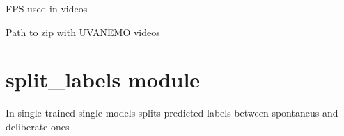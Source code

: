 \documentclass[letterpaper,10pt,english]{sphinxmanual}
\begin{document}
\begin{fulllineitems}
\begin{fulllineitems}
\begin{quote}
\begin{description}
\end{description}\end{quote}

\end{fulllineitems}


\begin{fulllineitems}
\label{\detokenize{net:net.UVANEMO.videos_frequency}}
\pysigstartsignatures
{}
\pysigstopsignatures
\sphinxAtStartPar
FPS used in videos

\end{fulllineitems}


\begin{fulllineitems}
\label{\detokenize{net:net.UVANEMO.videos_path}}
\pysigstartsignatures
{}
\pysigstopsignatures
\sphinxAtStartPar
Path to zip with UVA\sphinxhyphen{}NEMO videos

\end{fulllineitems}


\end{fulllineitems}


\sphinxstepscope


\section{split\_labels module}
\label{\detokenize{split_labels:module-split_labels}}\label{\detokenize{split_labels:split-labels-module}}\label{\detokenize{split_labels::doc}}

\begin{fulllineitems}
\label{\detokenize{split_labels:split_labels.main}}
\pysigstartsignatures
{}
\pysigstopsignatures
\sphinxAtStartPar
In single trained single models splits predicted labels between spontaneus and deliberate ones

\end{fulllineitems}
\end{document}
